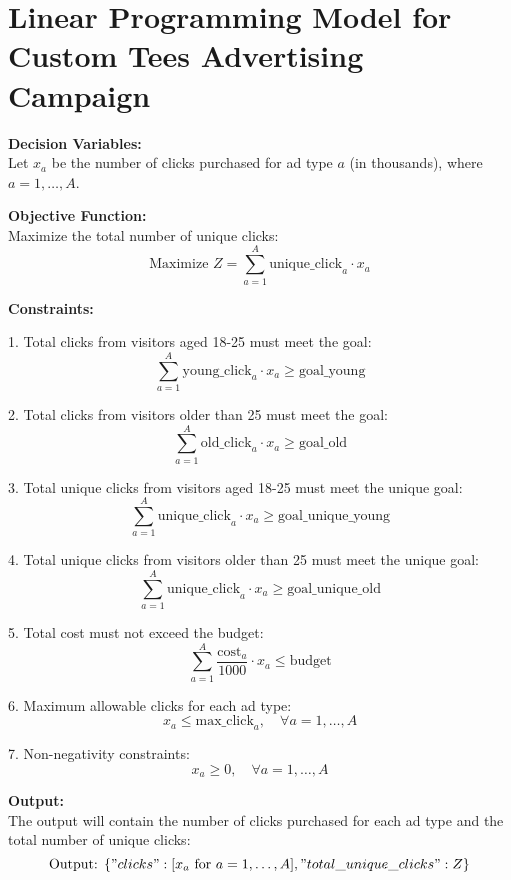 \documentclass{article}
\begin{document}
\section*{Linear Programming Model for Custom Tees Advertising Campaign}

\textbf{Decision Variables:} \\
Let \( x_a \) be the number of clicks purchased for ad type \( a \) (in thousands), where \( a = 1, \ldots, A \).

\textbf{Objective Function:} \\
Maximize the total number of unique clicks:
\[
\text{Maximize } Z = \sum_{a=1}^{A} \text{unique\_click}_{a} \cdot x_a
\]

\textbf{Constraints:} 

1. Total clicks from visitors aged 18-25 must meet the goal:
\[
\sum_{a=1}^{A} \text{young\_click}_{a} \cdot x_a \geq \text{goal\_young}
\]

2. Total clicks from visitors older than 25 must meet the goal:
\[
\sum_{a=1}^{A} \text{old\_click}_{a} \cdot x_a \geq \text{goal\_old}
\]

3. Total unique clicks from visitors aged 18-25 must meet the unique goal:
\[
\sum_{a=1}^{A} \text{unique\_click}_{a} \cdot x_a \geq \text{goal\_unique\_young}
\]

4. Total unique clicks from visitors older than 25 must meet the unique goal:
\[
\sum_{a=1}^{A} \text{unique\_click}_{a} \cdot x_a \geq \text{goal\_unique\_old}
\]

5. Total cost must not exceed the budget:
\[
\sum_{a=1}^{A} \frac{\text{cost}_{a}}{1000} \cdot x_a \leq \text{budget}
\]

6. Maximum allowable clicks for each ad type:
\[
x_a \leq \text{max\_click}_{a}, \quad \forall a = 1, \ldots, A
\]

7. Non-negativity constraints:
\[
x_a \geq 0, \quad \forall a = 1, \ldots, A
\]

\textbf{Output:} \\
The output will contain the number of clicks purchased for each ad type and the total number of unique clicks:
\[
\text{Output: } \{
    "clicks": [x_a \text{ for } a = 1, \ldots, A],
    "total\_unique\_clicks": Z
\}
\]
\end{document}
